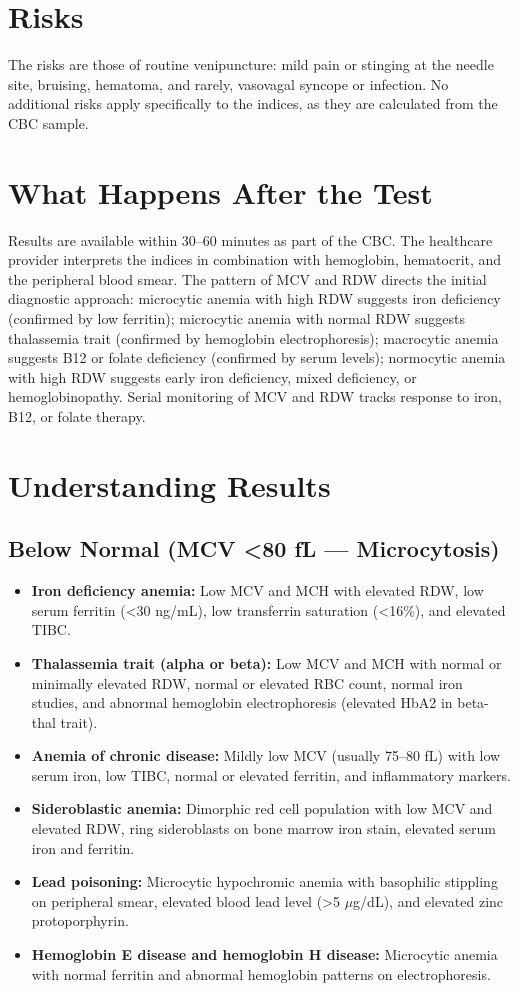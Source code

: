 \section*{Risks}
The risks are those of routine venipuncture: mild pain or stinging at the needle site, bruising, hematoma, and rarely, vasovagal syncope or infection. No additional risks apply specifically to the indices, as they are calculated from the CBC sample.

\section*{What Happens After the Test}
Results are available within 30--60 minutes as part of the CBC. The healthcare provider interprets the indices in combination with hemoglobin, hematocrit, and the peripheral blood smear. The pattern of MCV and RDW directs the initial diagnostic approach: microcytic anemia with high RDW suggests iron deficiency (confirmed by low ferritin); microcytic anemia with normal RDW suggests thalassemia trait (confirmed by hemoglobin electrophoresis); macrocytic anemia suggests B12 or folate deficiency (confirmed by serum levels); normocytic anemia with high RDW suggests early iron deficiency, mixed deficiency, or hemoglobinopathy. Serial monitoring of MCV and RDW tracks response to iron, B12, or folate therapy.

\section*{Understanding Results}

\subsection*{Below Normal (MCV <80 fL --- Microcytosis)}
\begin{itemize}
  \item \textbf{Iron deficiency anemia:} Low MCV and MCH with elevated RDW, low serum ferritin (<30 ng/mL), low transferrin saturation (<16\%), and elevated TIBC.
  \item \textbf{Thalassemia trait (alpha or beta):} Low MCV and MCH with normal or minimally elevated RDW, normal or elevated RBC count, normal iron studies, and abnormal hemoglobin electrophoresis (elevated HbA2 in beta-thal trait).
  \item \textbf{Anemia of chronic disease:} Mildly low MCV (usually 75--80 fL) with low serum iron, low TIBC, normal or elevated ferritin, and inflammatory markers.
  \item \textbf{Sideroblastic anemia:} Dimorphic red cell population with low MCV and elevated RDW, ring sideroblasts on bone marrow iron stain, elevated serum iron and ferritin.
  \item \textbf{Lead poisoning:} Microcytic hypochromic anemia with basophilic stippling on peripheral smear, elevated blood lead level (>5 $\mu$g/dL), and elevated zinc protoporphyrin.
  \item \textbf{Hemoglobin E disease and hemoglobin H disease:} Microcytic anemia with normal ferritin and abnormal hemoglobin patterns on electrophoresis.
\end{itemize}

